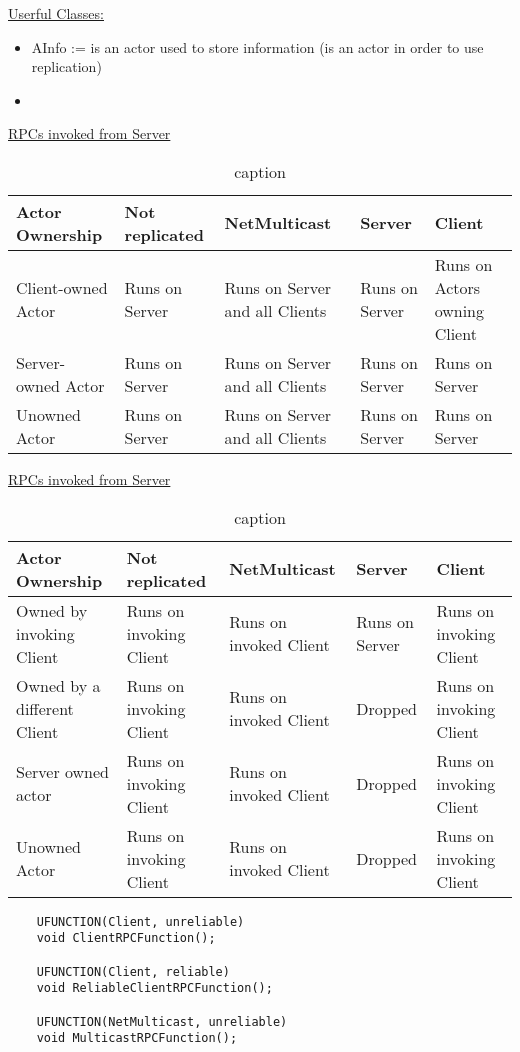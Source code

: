         \uline{Userful Classes:}
        \begin{itemize}
            \item AInfo := is an actor used to store information (is an actor in order to use replication)
            \item 
        \end{itemize}

        \uline{RPCs invoked from Server}
        \begin{table}[!htb]
            \begin{tabular}{|p{3cm}|p{3cm}|p{3cm}|p{3cm}|p{3cm}|}
                \hline
                    Actor Ownership & Not replicated & NetMulticast & Server & Client \\
                \hline
                    Client-owned Actor & Runs on Server & Runs on Server and all Clients & Runs on Server & Runs on Actors owning Client \\
                    Server-owned Actor & Runs on Server & Runs on Server and all Clients & Runs on Server & Runs on Server \\
                    Unowned Actor & Runs on Server & Runs on Server and all Clients & Runs on Server & Runs on Server \\
                \hline
            \end{tabular}
        \caption{ caption }  
        \end{table}
        
        \uline{RPCs invoked from Server}
        \begin{table}[!htb]
            \begin{tabular}{|p{3cm}|p{3cm}|p{3cm}|p{3cm}|p{3cm}|}
                \hline
                    Actor Ownership & Not replicated & NetMulticast & Server & Client \\
                \hline
                    Owned by invoking Client & Runs on invoking Client & Runs on invoked Client & Runs on Server & Runs on invoking Client \\
                    Owned by a different Client & Runs on invoking Client & Runs on invoked Client & Dropped & Runs on invoking Client \\
                    Server owned actor & Runs on invoking Client & Runs on invoked Client & Dropped & Runs on invoking Client \\
                    Unowned Actor & Runs on invoking Client & Runs on invoked Client & Dropped & Runs on invoking Client \\
                \hline
            \end{tabular}
        \caption{ caption }  
        \end{table}
        \begin{lstlisting}
    UFUNCTION(Client, unreliable)
    void ClientRPCFunction();

    UFUNCTION(Client, reliable)
    void ReliableClientRPCFunction();

    UFUNCTION(NetMulticast, unreliable)
    void MulticastRPCFunction();

        \end{lstlisting}


